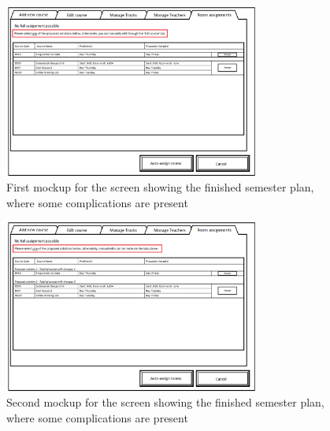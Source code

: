 \begin{figure}[htb]
\begin{center}
\leavevmode
\includegraphics[width=0.75\textwidth]{images/courseplan_Room_Assignments_clash}
\end{center}
\caption{First mockup for the screen showing the finished semester plan, where some complications are present}
\label{fig:app2_mock1_7}
\end{figure}

\begin{figure}[htb]
\begin{center}
\leavevmode
\includegraphics[width=0.75\textwidth]{images/courseplan2_Room_Assignments_clash}
\end{center}
\caption{Second mockup for the screen showing the finished semester plan, where some complications are present}
\label{fig:app2_mock2_7}
\end{figure}

\clearpage